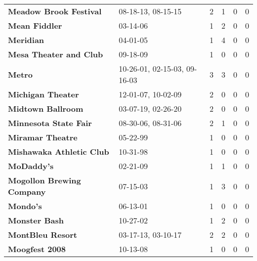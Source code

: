 \begin{supertabular}{llllll}
                                       \textbf{Meadow Brook Festival} &            08-18-13, 08-15-15 &  2 &   1 &  0 &  0 \\
                                                \textbf{Mean Fiddler} &                      03-14-06 &  1 &   2 &  0 &  0 \\
                                                    \textbf{Meridian} &                      04-01-05 &  1 &   4 &  0 &  0 \\
                                       \textbf{Mesa Theater and Club} &                      09-18-09 &  1 &   0 &  0 &  0 \\
                                                       \textbf{Metro} &  10-26-01, 02-15-03, 09-16-03 &  3 &   3 &  0 &  0 \\
                                            \textbf{Michigan Theater} &            12-01-07, 10-02-09 &  2 &   0 &  0 &  0 \\
                                            \textbf{Midtown Ballroom} &            03-07-19, 02-26-20 &  2 &   0 &  0 &  0 \\
                                        \textbf{Minnesota State Fair} &            08-30-06, 08-31-06 &  2 &   1 &  0 &  0 \\
                                             \textbf{Miramar Theatre} &                      05-22-99 &  1 &   0 &  0 &  0 \\
                                     \textbf{Mishawaka Athletic Club} &                      10-31-98 &  1 &   0 &  0 &  0 \\
                                                   \textbf{MoDaddy's} &                      02-21-09 &  1 &   1 &  0 &  0 \\
                                    \textbf{Mogollon Brewing Company} &                      07-15-03 &  1 &   3 &  0 &  0 \\
                                                     \textbf{Mondo's} &                      06-13-01 &  1 &   0 &  0 &  0 \\
                                                \textbf{Monster Bash} &                      10-27-02 &  1 &   2 &  0 &  0 \\
                                             \textbf{MontBleu Resort} &            03-17-13, 03-10-17 &  2 &   2 &  0 &  0 \\
                                               \textbf{Moogfest 2008} &                      10-13-08 &  1 &   0 &  0 &  0 \\

\end{supertabular}
